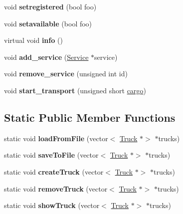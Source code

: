 \begin{DoxyCompactItemize}
void {\bfseries setregistered} (bool foo)
\item 
\mbox{\label{class_truck_a59ca935a364da118131ed85647aa4f0d}} 
void {\bfseries setavailable} (bool foo)
\item 
\mbox{\label{class_truck_a38f09eab2822524e355ecf6d0a13f7de}} 
virtual void {\bfseries info} ()
\item 
\mbox{\label{class_truck_a03c8acd51c35f24db74cd8b2ee20cacb}} 
void {\bfseries add\+\_\+service} (\hyperlink{class_service}{Service} $\ast$service)
\item 
\mbox{\label{class_truck_a0abc7397fd6dba0eeeb2b5ae3e225fd1}} 
void {\bfseries remove\+\_\+service} (unsigned int id)
\item 
\mbox{\label{class_truck_aca68ecb83bcdc73de6bd381dccb70e4d}} 
void {\bfseries start\+\_\+transport} (unsigned short \hyperlink{class_truck_a968fc6b1a6171a03e4254d6615da4ecd}{cargo})
\end{DoxyCompactItemize}
\subsection*{Static Public Member Functions}
\begin{DoxyCompactItemize}
\item 
\mbox{\label{class_truck_ae2d129e4cdd6760feee9a81421d40e17}} 
static void {\bfseries load\+From\+File} (vector$<$ \hyperlink{class_truck}{Truck} $\ast$$>$ $\ast$trucks)
\item 
\mbox{\label{class_truck_ad03e7d588f7f6dc24e1423e2e481ad3a}} 
static void {\bfseries save\+To\+File} (vector$<$ \hyperlink{class_truck}{Truck} $\ast$$>$ $\ast$trucks)
\item 
\mbox{\label{class_truck_a4b2a202b4fe0bf70249493a9aa30f5dd}} 
static void {\bfseries create\+Truck} (vector$<$ \hyperlink{class_truck}{Truck} $\ast$$>$ $\ast$trucks)
\item 
\mbox{\label{class_truck_acb3e375dfa4ba812de7e65f0b3e37ded}} 
static void {\bfseries remove\+Truck} (vector$<$ \hyperlink{class_truck}{Truck} $\ast$$>$ $\ast$trucks)
\item 
\mbox{\label{class_truck_a61f38539157cdc6879a15e0a02255edc}} 
static void {\bfseries show\+Truck} (vector$<$ \hyperlink{class_truck}{Truck} $\ast$$>$ $\ast$trucks)
\end{DoxyCompactItemize}
